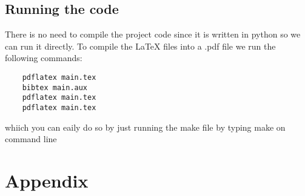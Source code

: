 \documentclass{article}
\begin{document}
\subsection{Running the code}
    There is no need to compile the project code since it is written in python so we can run it directly. To compile the LaTeX files into a .pdf file we run the following commands:
    \begin{verbatim}
    pdflatex main.tex
    bibtex main.aux
    pdflatex main.tex
    pdflatex main.tex
    \end{verbatim}
    whiich you can eaily do so by just running the make file by typing make on command line
    
\section{Appendix}
\end{document}
